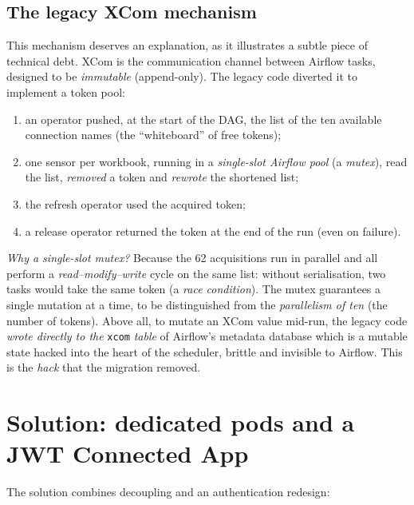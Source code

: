 \subsection*{The legacy XCom mechanism}

This mechanism deserves an explanation, as it illustrates a subtle piece of technical debt. XCom is the communication channel between Airflow tasks, designed to be \emph{immutable} (append-only). The legacy code diverted it to implement a token pool:

\begin{enumerate}
  \item an operator pushed, at the start of the DAG, the list of the ten available connection names (the ``whiteboard'' of free tokens);
  \item one sensor per workbook, running in a \emph{single-slot Airflow pool} (a \emph{mutex}), read the list, \emph{removed} a token and \emph{rewrote} the shortened list;
  \item the refresh operator used the acquired token;
  \item a release operator returned the token at the end of the run (even on failure).
\end{enumerate}

\emph{Why a single-slot mutex?} Because the 62 acquisitions run in parallel and all perform a \emph{read–modify–write} cycle on the same list: without serialisation, two tasks would take the same token (a \emph{race condition}). The mutex guarantees a single mutation at a time, to be distinguished from the \emph{parallelism of ten} (the number of tokens). Above all, to mutate an XCom value mid-run, the legacy code \emph{wrote directly to the} \texttt{xcom} \emph{table} of Airflow's metadata database which is a mutable state hacked into the heart of the scheduler, brittle and invisible to Airflow. This is the \emph{hack} that the migration removed.

\section{Solution: dedicated pods and a JWT Connected App}

The solution combines decoupling and an authentication redesign:

